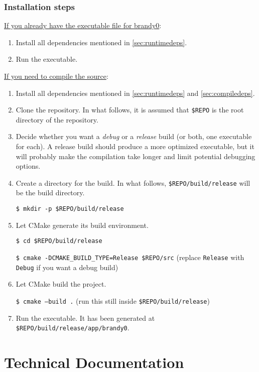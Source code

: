 \documentclass{article}
\newcommand{\icd}[1]{\texttt{#1}}
\newcommand{\ccd}[1]{\colorbox{gray!15!white}{\texttt{#1}}}
\newcommand{\scd}[1]{
	\vspace*{5pt}

	\ccd{#1}
	\vspace*{5pt}
}
\newcommand{\nscd}[1]{\scd{\$ #1}}
\newcommand{\pname}{brandy0}
\begin{document}
\subsubsection{Installation steps}
\underline{If you already have the executable file for \pname{}}:
\begin{enumerate}
	\item
		Install all dependencies mentioned in \ref{sec:runtimedeps}.
	\item
		Run the executable.
\end{enumerate}
\underline{If you need to compile the source}:
\begin{enumerate}
	\item
		Install all dependencies mentioned in \ref{sec:runtimedeps} and \ref{sec:compiledeps}.
	\item
		Clone the repository. In what follows, it is assumed that \icd{\$REPO} is the root directory of the repository.
	\item
		Decide whether you want a \emph{debug} or a \emph{release} build (or both, one executable for each). A release build should produce a more optimized executable, but it will probably make the compilation take longer and limit potential debugging options.
	\item
		Create a directory for the build. In what follows, \icd{\$REPO/build/release} will be the build directory.
		\nscd{mkdir -p \$REPO/build/release}
	\item
		Let CMake generate its build environment.
		\nscd{cd \$REPO/build/release}
		\nscd{cmake -DCMAKE\_BUILD\_TYPE=Release \$REPO/src} (replace \icd{Release} with \icd{Debug} if you want a debug build)
	\item
		Let CMake build the project.
		\nscd{cmake --build .} (run this still inside \icd{\$REPO/build/release})
	\item
		Run the executable. It has been generated at \icd{\$REPO/build/release/app/brandy0}.
\end{enumerate}

\section{Technical Documentation}
\end{document}
